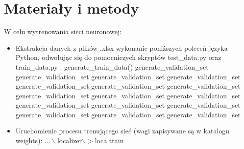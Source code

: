 \documentclass{classrep}
\begin{document}
\section{Materiały i metody}
{
	W celu wytrenowania sieci neuronowej:
	 \begin{itemize}
            	\item {} Ekstrakcja danych z plików .xlsx \ppauza wykonanie poniższych poleceń języka Python, odwołując się do pomocniczych skryptów test\_data.py oraz train\_data.py :			\linebreak\linebreak 
			generate\_train\_data() \linebreak
    			generate\_validation\_set \linebreak
			generate\_validation\_set \linebreak
			generate\_validation\_set \linebreak
			generate\_validation\_set \linebreak
			generate\_validation\_set \linebreak
			generate\_validation\_set \linebreak
			generate\_validation\_set \linebreak
			generate\_validation\_set \linebreak
			generate\_validation\_set \linebreak
			generate\_validation\_set\linebreak
			generate\_validation\_set \linebreak
			generate\_validation\_set \linebreak
			generate\_validation\_set \linebreak
			generate\_validation\_set\linebreak
			generate\_validation\_set\linebreak
			generate\_validation\_set\linebreak
            	\item {} Uruchomienie procesu trenującego sieć (wagi zapisywane są w katalogu weights):
			\linebreak\linebreak
			$...\backslash$localizer$\backslash >$loca train 
			

\end{itemize}}
\end{document}
